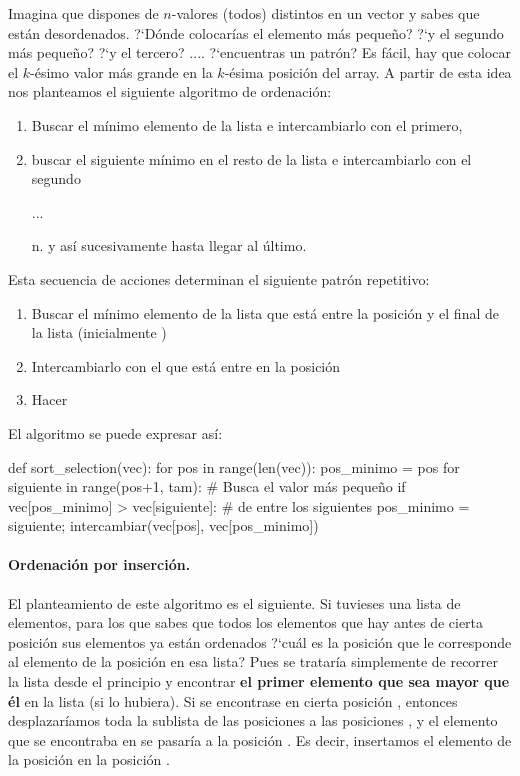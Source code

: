 Imagina que dispones de $n$-valores (todos) distintos en un vector y sabes que están desordenados. ?`Dónde colocarías el elemento más pequeño? ?`y el segundo más pequeño? ?`y el tercero? .... ?`encuentras un patrón? Es fácil, hay que colocar el $k$-ésimo valor más grande en la $k$-ésima posición del array. A partir de esta idea nos planteamos el siguiente algoritmo de ordenación:
\begin{enumerate}
\item Buscar el mínimo elemento de la lista e intercambiarlo con el primero,
\item buscar el siguiente mínimo en el resto de la lista e intercambiarlo con el segundo

...

\item[n.] y así sucesivamente hasta llegar al último.
\end{enumerate}

\noindent Esta secuencia de acciones determinan el siguiente patrón repetitivo:
\begin{enumerate}
\item Buscar el mínimo elemento de la lista que está entre la posición  y el final de la lista (inicialmente )
\item Intercambiarlo con el que está entre en la posición 
\item Hacer 
\end{enumerate}

\noindent El algoritmo se puede expresar así:

\begin{pyverbatim}[][frame=single]
def sort_selection(vec):
  for pos in range(len(vec)):
    pos_minimo = pos
    for siguiente in range(pos+1, tam):     # Busca el valor más pequeño
      if vec[pos_minimo] > vec[siguiente]:  # de entre los siguientes
        pos_minimo = siguiente;
    intercambiar(vec[pos], vec[pos_minimo])     
\end{pyverbatim} 


\paragraph*{Ordenación por inserción.} 

El planteamiento de este algoritmo es el siguiente. Si tuvieses una lista de elementos, para los que sabes que todos los elementos que hay antes de cierta posición  sus elementos ya están ordenados ?`cuál es la posición que le corresponde al elemento de la posición  en esa lista? Pues se trataría simplemente de recorrer la lista desde el principio y encontrar {\bf el primer elemento que sea mayor que él} en la lista (si lo hubiera). Si se encontrase en cierta posición , entonces desplazaríamos toda la sublista de las posiciones \cm{[k, pos-1]} a las posiciones \cm{[k+1,pos]}, y el elemento que se encontraba en  se pasaría a la posición . Es decir, insertamos el elemento de la posición  en la posición .

